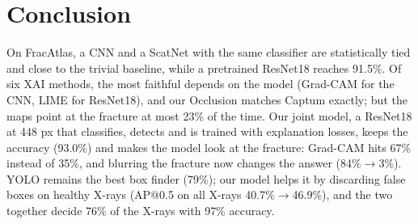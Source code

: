 \documentclass[conference]{IEEEtran}
\begin{document}
\section{Conclusion}
On FracAtlas, a CNN and a ScatNet with the same classifier are statistically tied and close to the trivial baseline,
while a pretrained ResNet18 reaches 91.5\%. Of six XAI methods, the most faithful depends on the model (Grad-CAM for the
CNN, LIME for ResNet18), and our Occlusion matches Captum exactly; but the maps point at the fracture at most 23\% of the
time. Our joint model, a ResNet18 at 448 px that classifies, detects and is trained with explanation losses, keeps the
accuracy (93.0\%) and makes the model look at the fracture: Grad-CAM hits 67\% instead of 35\%, and blurring the fracture
now changes the answer (84\%$\to$3\%). YOLO remains the best box finder (79\%); our model helps it by discarding false
boxes on healthy X-rays (AP@0.5 on all X-rays 40.7\%$\to$46.9\%), and the two together decide 76\% of the X-rays with 97\%
accuracy.
\end{document}
